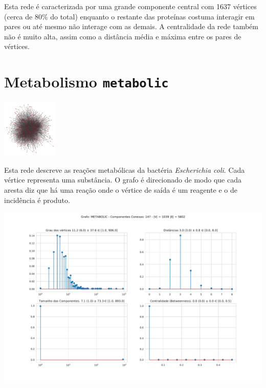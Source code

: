 \documentclass{homework}
\begin{document}
	Esta rede é caracterizada por uma grande componente central com 1637 vértices (cerca de 80\% do total) enquanto o restante das proteínas costuma interagir em pares ou até mesmo não interage com as demais. A centralidade da rede também não é muito alta, assim como a distância média e máxima entre os pares de vértices.
	
		
	\section{Metabolismo \texttt{metabolic}}
	
	\begin{multicols}{2}
		\begin{fig}
			\includegraphics[width=0.2\textwidth]{../results/metabolic-graph.png}
		\end{fig}	
		
		Esta rede descreve as reações metabólicas da bactéria \textit{Escherichia coli}. Cada vértice representa uma substância. O grafo é direcionado de modo que cada aresta diz que há uma reação onde o vértice de saída é um reagente e o de incidência é produto.
	\end{multicols}
	
	\begin{fig}
		\includegraphics[width=\textwidth]{../results/metabolic-data.pdf}
	\end{fig}
\end{document}
